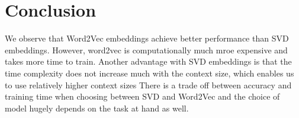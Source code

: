 \documentclass[a4paper,9pt]{report}
\begin{document}
\section*{Conclusion}
We observe that Word2Vec embeddings achieve better performance than SVD embeddings. 
However, word2vec is computationally much mroe expensive and takes more time to train. 
Another advantage with SVD embeddings is that the time complexity does not increase much with the context size, which enables us to use relatively higher context sizes
There is a trade off between accuracy and training time when choosing between SVD and Word2Vec and the choice of model hugely depends on the task at hand as well.
\end{document}
